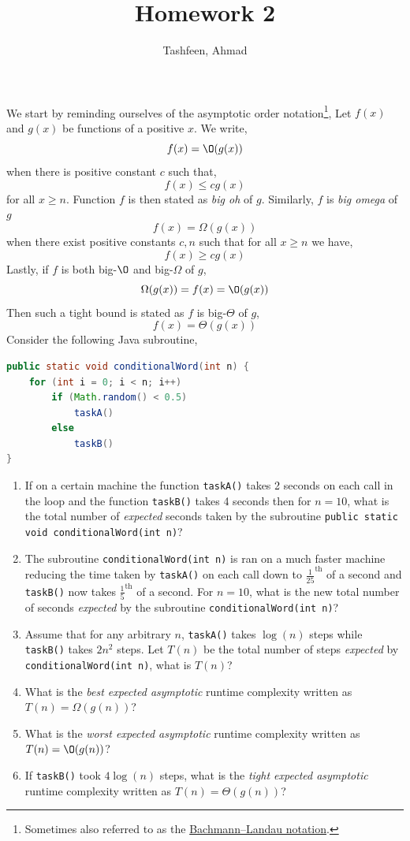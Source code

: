 \documentclass{homework}
\author{Tashfeen, Ahmad}
\title{Homework 2}
\begin{document}
 \maketitle

We start by reminding ourselves of the asymptotic order
notation\footnote{Sometimes also referred to as
  the \href{https://en.wikipedia.org/wiki/Big_O_notation}{Bachmann–Landau
    notation}.}, Let $f(x)$ and $g(x)$ be functions of a positive
$x$. We write,
\[
  f(x) = \O(g(x))
\]
when there is positive constant $c$ such that,
\[
  f(x) \leq cg(x)
\]
for all $x \geq n$. Function $f$ is then
stated as \textit{big oh} of $g$. Similarly, $f$ is \textit{big omega} of $g$ \ie
\[
  f(x) = \Omega(g(x))
\]
when there exist positive constants $c, n$ such that for all $x \geq n$ we have,
\[
  f(x) \geq cg(x)
\]
Lastly, if $f$ is both big-$\O$ and big-$\Omega$ of $g$,
\[
  \Omega(g(x)) = f(x) = \O(g(x))
\]
Then such a tight bound is stated as $f$ is big-$\Theta$ of $g$,
\[
  f(x) = \Theta(g(x))
\]
\question Consider the following Java subroutine,
\begin{lstlisting}[language=java]
public static void conditionalWord(int n) {
    for (int i = 0; i < n; i++)
        if (Math.random() < 0.5)
            taskA()
        else
            taskB()
}
\end{lstlisting}
\begin{enumerate}
  \item If on a certain machine the function \texttt{taskA()} takes
        2 seconds on each call in the loop and the function
        \texttt{taskB()} takes 4 seconds then for $n=10$, what is the
        total number of \textit{expected} seconds taken by the subroutine
        \texttt{public static void conditionalWord(int n)}?
  \item The subroutine \texttt{conditionalWord(int n)} is ran on a
        much faster machine reducing the time taken by \texttt{taskA()} on
        each call down to $\frac{1}{25}^\text{th}$ of a second and
        \texttt{taskB()} now takes $\frac{1}{5}^\text{th}$ of a
        second. For ${n=10}$, what is the new total number of
        seconds \textit{expected} by the subroutine \texttt{conditionalWord(int n)}?
  \item Assume that for any arbitrary $n$, \texttt{taskA()} takes
        $\log(n)$ steps while \texttt{taskB()} takes $2n^2$ steps. Let
        $T(n)$ be the total number of steps \textit{expected} by
        \texttt{conditionalWord(int n)}, what is $T(n)$?
  \item What is the \textit{best expected asymptotic} runtime
        complexity written as $T(n) = \Omega(g(n))$?
  \item What is the \textit{worst expected asymptotic} runtime
        complexity written as $T(n) = \O(g(n))$?
  \item If \texttt{taskB()} took $4\log(n)$ steps, what is the
        \textit{tight expected asymptotic} runtime complexity written
        as $T(n) = \Theta(g(n))$?
\end{enumerate}
\end{document}
